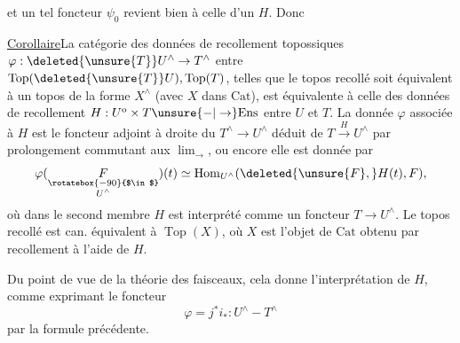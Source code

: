 et un tel foncteur $\psi_0$ revient bien à celle d'un
$H$. Donc

\uline{Corollaire}\quad La catégorie des données de recollement
topossiques $\varphi:\deleted{\unsure{T}}U^\wedge\to T^\wedge$ entre $\operatorname{Top}(\deleted{\unsure{T}}U),\operatorname{Top}(T)$,
telles que  le topos recollé soit  équivalent à
un topos de la forme $X^\wedge$ (avec $X$ dans $\mathrm{Cat}$),
est équivalente à celle des données de recollement
$H:U^{\mathrm o}\times T\unsure{-|\to}\mathrm{Ens}$ entre $U$ et $T$.  La
 donnée  $\varphi$ associée à $H$ est le foncteur adjoint
à droite du $T^\wedge\longrightarrow U^\wedge$ déduit de $T\xrightarrow{H}U^\wedge$
par prolongement commutant aux $\lim_{\rightarrow}$, ou encore
elle est donnée par
\[
\varphi(\underset{\substack{\rotatebox{-90}{$\in$}\\U^\wedge}}{F})(t)
\simeq\operatorname{Hom}_{U^\wedge}(\deleted{\unsure{F},}H(t),F),
\]
où dans le second membre $H$ est interprété comme
un foncteur $T\longrightarrow U^\wedge$. Le topos recollé
 est can. équivalent à $\operatorname{Top}(X)$, où $X$ est
l'objet de $\mathrm{Cat}$ obtenu par recollement à l'aide
de $H$.

Du point de vue de la théorie des faisceaux,
cela donne l'interprétation de $H$, comme
exprimant le foncteur
\[
\varphi=j^*i_*:U^\wedge-T^\wedge
\]
par la formule précédente.
